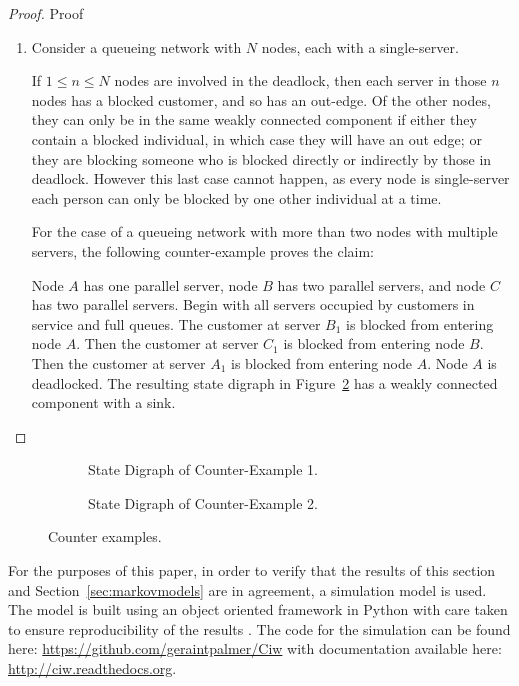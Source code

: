 \documentclass{article}
\numberwithin{equation}{section}
\begin{document}
\begin{proof}{Proof}
\begin{enumerate}
  \item
  Consider a queueing network with $N$ nodes, each with a single-server.

  If $1 \leq n \leq N$ nodes are involved in the deadlock, then each server in those $n$ nodes has a blocked customer, and so has an out-edge.
  Of the other nodes, they can only be in the same weakly connected component if either they contain a blocked individual, in which case they will have an out edge; or they are blocking someone who is blocked directly or indirectly by those in deadlock.
  However this last case cannot happen, as every node is single-server each person can only be blocked by one other individual at a time.

  For the case of a queueing network with more than two nodes with multiple servers, the following counter-example proves the claim:

  Node $A$ has one parallel server, node $B$ has two parallel servers, and node $C$ has two parallel servers.
  Begin with all servers occupied by customers in service and full queues.
  The customer at server $B_1$ is blocked from entering node $A$.
  Then the customer at server $C_1$ is blocked from entering node $B$.
  Then the customer at server $A_1$ is blocked from entering node $A$.
  Node $A$ is deadlocked.
  The resulting state digraph in Figure~\ref{fig:counter_example_2} has a weakly connected component with a sink.
  \end{enumerate}
\end{proof}

\begin{figure}
\begin{subfigure}{0.5\textwidth}
\begin{center}

\end{center}
\caption{State Digraph of Counter-Example 1.}
\label{fig:counter_example_1}
\end{subfigure}
\begin{subfigure}{0.5\textwidth}
\begin{center}

\end{center}
\caption{State Digraph of Counter-Example 2.}
\label{fig:counter_example_2}
\end{subfigure}
\caption{Counter examples.}
\label{fig:counter_examples}
\end{figure}

For the purposes of this paper, in order to verify that the results of this
section and Section~\ref{sec:markovmodels} are in agreement, a simulation model
is used. The model is built using an object oriented framework in Python
\cite{python13} with care taken to ensure reproducibility of the results
\cite{hongetal15}. The code for the simulation can
be found here: \url{https://github.com/geraintpalmer/Ciw} with documentation
available here: \url{http://ciw.readthedocs.org}.
\end{document}
